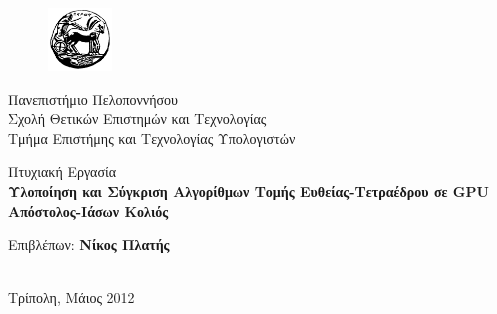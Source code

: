 
\begin{titlepage}

\begin{figure}
\vspace*{-11pt}
\includegraphics[width=0.15\textwidth]{./graphics/uoplogo.png}  
\end{figure}

\noindent Πανεπιστήμιο Πελοποννήσου\\
Σχολή Θετικών Επιστημών και Τεχνολογίας\\
Τμήμα Επιστήμης και Τεχνολογίας Υπολογιστών\\[3cm]

\vspace*{-10pt}

\begin{center}

{\LARGE {\noindent Πτυχιακή Εργασία}\\[2.5cm]

{\bf Υλοποίηση και Σύγκριση Αλγορίθμων Τομής Ευθείας-Τετραέδρου σε GPU\\[4cm]

Απόστολος-Ιάσων Κολιός}}\\[5cm]

\begin{Large}Επιβλέπων: {\bf Νίκος Πλατής}\end{Large}\\[3cm]

Τρίπολη, Μάιος 2012\\

\vfill
\end{center}
\end{titlepage}
